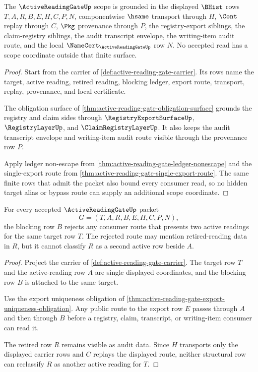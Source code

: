 \begin{theorem}
\label{thm:active-reading-gate-scope-grounding}
The $\ActiveReadingGateUp$ scope is grounded in the displayed $\BHist$ rows $T,A,R,B,E,H,C,P,N$, componentwise $\hsame$ transport through $H$, $\Cont$ replay through $C$, $\Pkg$ provenance through $P$, the registry-export siblings, the claim-registry siblings, the audit transcript envelope, the writing-item audit route, and the local $\NameCert_{\ActiveReadingGateUp}$ row $N$. No accepted read has a scope coordinate outside that finite surface.
\end{theorem}
\begin{proof}
Start from the carrier of \autoref{def:active-reading-gate-carrier}. Its rows name the target, active reading, retired reading, blocking ledger, export route, transport, replay, provenance, and local certificate.

The obligation surface of \autoref{thm:active-reading-gate-obligation-surface} grounds the registry and claim sides through $\RegistryExportSurfaceUp$, $\RegistryLayerUp$, and $\ClaimRegistryLayerUp$. It also keeps the audit transcript envelope and writing-item audit route visible through the provenance row $P$.

Apply ledger non-escape from \autoref{thm:active-reading-gate-ledger-nonescape} and the single-export route from \autoref{thm:active-reading-gate-single-export-route}. The same finite rows that admit the packet also bound every consumer read, so no hidden target alias or bypass route can supply an additional scope coordinate.
\end{proof}

\begin{theorem}
\label{thm:active-reading-gate-single-active-obstruction}
For every accepted $\ActiveReadingGateUp$ packet
$$
G=(T,A,R,B,E,H,C,P,N),
$$
the blocking row $B$ rejects any consumer route that presents two active readings for the same target row $T$. The rejected route may mention retired-reading data in $R$, but it cannot classify $R$ as a second active row beside $A$.
\end{theorem}
\begin{proof}
Project the carrier of \autoref{def:active-reading-gate-carrier}. The target row $T$ and the active-reading row $A$ are single displayed coordinates, and the blocking row $B$ is attached to the same target.

Use the export uniqueness obligation of \autoref{thm:active-reading-gate-export-uniqueness-obligation}. Any public route to the export row $E$ passes through $A$ and then through $B$ before a registry, claim, transcript, or writing-item consumer can read it.

The retired row $R$ remains visible as audit data. Since $H$ transports only the displayed carrier rows and $C$ replays the displayed route, neither structural row can reclassify $R$ as another active reading for $T$.
\end{proof}

